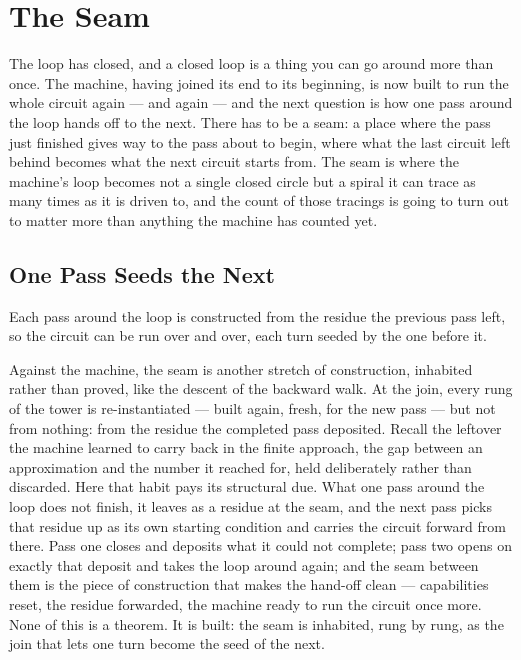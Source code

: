 \chapter{The Seam}

The loop has closed, and a closed loop is a thing you can go around more than once. The machine, having joined its
end to its beginning, is now built to run the whole circuit again --- and again --- and the next question is how
one pass around the loop hands off to the next. There has to be a seam: a place where the pass just
finished gives way to the pass about to begin, where what the last circuit left behind becomes what the next
circuit starts from. The seam is where the machine's loop becomes not a single closed circle but a spiral it can
trace as many times as it is driven to, and the count of those tracings is going to turn out to matter more than
anything the machine has counted yet.

\section{One Pass Seeds the Next}

Each pass around the loop is constructed from the residue the previous pass left, so the circuit can be run over
and over, each turn seeded by the one before it.

Against the machine, the seam is another stretch of construction, inhabited rather than proved, like the descent
of the backward walk. At the join, every rung of the tower is re-instantiated --- built again, fresh, for the new
pass --- but not from nothing: from the residue the completed pass deposited. Recall the leftover the machine
learned to carry back in the finite approach, the gap between an approximation and the number it reached for, held
deliberately rather than discarded. Here that habit pays its structural due. What one pass around the loop does
not finish, it leaves as a residue at the seam, and the next pass picks that residue up as its own starting
condition and carries the circuit forward from there. Pass one closes and deposits what it could not complete;
pass two opens on exactly that deposit and takes the loop around again; and the seam between them is the piece of
construction that makes the hand-off clean --- capabilities reset, the residue forwarded, the machine ready to run
the circuit once more. None of this is a theorem. It is built: the seam is inhabited, rung by rung, as the join
that lets one turn become the seed of the next.

